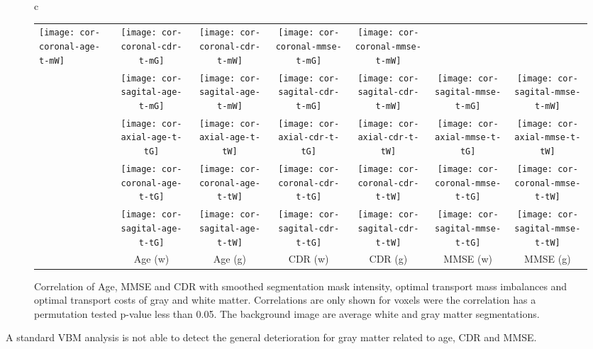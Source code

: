 \documentclass{llncs}
\begin{document}
\begin{figure}[b!]
\begin{tabular}{c}
\begin{tabular}{l|cc|cc|cc}
\texttt{[image: cor-coronal-age-t-mW]} &
\texttt{[image: cor-coronal-cdr-t-mG]} &
\texttt{[image: cor-coronal-cdr-t-mW]} &
\texttt{[image: cor-coronal-mmse-t-mG]} &
\texttt{[image: cor-coronal-mmse-t-mW]} \\ 
%
        &
\texttt{[image: cor-sagital-age-t-mG]} &
\texttt{[image: cor-sagital-age-t-mW]} &
\texttt{[image: cor-sagital-cdr-t-mG]} &
\texttt{[image: cor-sagital-cdr-t-mW]} &
\texttt{[image: cor-sagital-mmse-t-mG]} &
\texttt{[image: cor-sagital-mmse-t-mW]} \\ \hline \hline
\parbox[t]{2mm}{}&
\texttt{[image: cor-axial-age-t-tG]} &
\texttt{[image: cor-axial-age-t-tW]} &
\texttt{[image: cor-axial-cdr-t-tG]} &
\texttt{[image: cor-axial-cdr-t-tW]} &
\texttt{[image: cor-axial-mmse-t-tG]} &
\texttt{[image: cor-axial-mmse-t-tW]} \\ 
%
        &
\texttt{[image: cor-coronal-age-t-tG]} &
\texttt{[image: cor-coronal-age-t-tW]} &
\texttt{[image: cor-coronal-cdr-t-tG]} &
\texttt{[image: cor-coronal-cdr-t-tW]} &
\texttt{[image: cor-coronal-mmse-t-tG]} &
\texttt{[image: cor-coronal-mmse-t-tW]} \\ 
%
        &
\texttt{[image: cor-sagital-age-t-tG]} &
\texttt{[image: cor-sagital-age-t-tW]} &
\texttt{[image: cor-sagital-cdr-t-tG]} &
\texttt{[image: cor-sagital-cdr-t-tW]} &
\texttt{[image: cor-sagital-mmse-t-tG]} &
\texttt{[image: cor-sagital-mmse-t-tW]} \\ \hline \hline
%
& \parbox[b][4mm]{12mm}{Age (w)} 
& \parbox[b][4mm]{12mm}{Age (g)} 
& \parbox[b][4mm]{14mm}{CDR (w)} 
& \parbox[b][4mm]{14mm}{CDR (g) }
& \parbox[b][4mm]{18mm}{MMSE (w)}
& \parbox[b][4mm]{18mm}{MMSE (g)}
\end{tabular}
\end{tabular}
\caption{\label{fig:cor-oasis-gray}
Correlation of Age, MMSE and CDR with smoothed segmentation mask intensity,
optimal transport mass imbalances and optimal transport costs of gray and white
matter.  Correlations are only shown for voxels were the correlation has a
permutation tested p-value less than 0.05. The background image are average
white and gray matter segmentations. 
} 
\end{figure} \endgroup
A standard VBM analysis is not able to detect the general deterioration for
gray matter related to age, CDR and MMSE.
\end{document}
